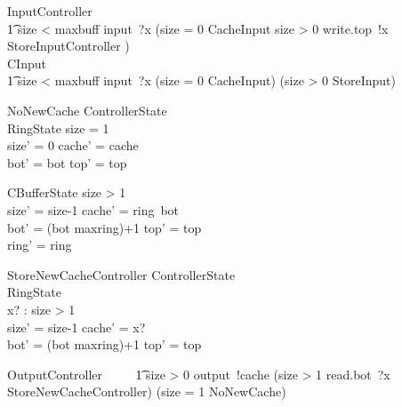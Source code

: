 \begin{circusaction}
    InputController ~~\circdef~~ \\
        \t1 \lcircguard size < maxbuff \rcircguard \circguard input~?x \then
            (\lcircguard size = 0 \rcircguard \circguard CacheInput
            \extchoice
             \lcircguard size > 0 \rcircguard \circguard write.top~!x \then StoreInputController
            ) \\
    CInput \circdef \\
        \t1 \lcircguard size < maxbuff \rcircguard \circguard input~?x \then
            (\lcircguard size = 0 \rcircguard \circguard CacheInput)
            \extchoice
            (\lcircguard size > 0 \rcircguard \circguard StoreInput)
\end{circusaction}

\begin{schema}{NoNewCache}
    \Delta ControllerState
    \\%
    \Xi RingState
\where
           size = 1
            \\%
            size' = 0 \land cache' = cache
            \\%
            bot' = bot \land top' = top
\end{schema}


\begin{StoreNewCache}
    \Delta CBufferState
\where
            size > 1
            \\
            size' = size-1 \land cache' = ring~bot
            \\
            bot' = (bot \mod maxring)+1 \land top' = top
            \\
            ring' = ring
\end{StoreNewCache}

\begin{schema}{StoreNewCacheController}
    \Delta ControllerState
            \\%
            \Xi RingState
            \\%
            x? : \nat
\where
            size > 1
            \\%
            size' = size-1 \land cache' = x?
            \\%
            bot' = (bot \mod maxring)+1 \land top' = top
\end{schema}

\begin{circusaction}
    OutputController ~~\circdef~~
            \t1 \lcircguard size > 0 \rcircguard \circguard output~!cache \then
            (\lcircguard size > 1 \rcircguard \circguard read.bot~?x \then StoreNewCacheController)
            \extchoice
            (\lcircguard size = 1 \rcircguard \circguard NoNewCache)
\end{circusaction}

